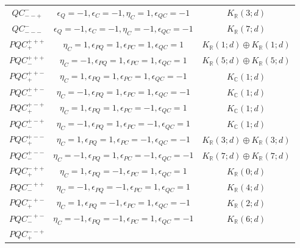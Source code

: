 \documentclass{tADP2e}
\theoremstyle{plain}
\theoremstyle{plain}
\theoremstyle{definition}
\begin{document}
\begin{appendices}
\begin{table}[tbp]
\begin{center}
\begin{tabular}{ccc}
$QC^-_{--+}$ & %
$\epsilon_Q=-1,\epsilon_C=-1,\eta_C=1,\epsilon_{QC}=-1$ & $K_{\mathbb{R}}(3;d)$ \\
$QC^-_{---}$ & %
$\epsilon_Q=-1,\epsilon_C=-1,\eta_C=-1,\epsilon_{QC}=-1$ & $K_{\mathbb{R}}(7;d)$ \\
$PQC^{+++}_+$ & %
$\eta_C=1,\epsilon_{PQ}=1,\epsilon_{PC}=1,\epsilon_{QC}=1$ & $K_{\mathbb{R}}(1;d)\oplus K_{\mathbb{R}}(1;d)$ \\
$PQC^{+++}_-$ & %
$\eta_C=-1,\epsilon_{PQ}=1,\epsilon_{PC}=1,\epsilon_{QC}=1$ & $K_{\mathbb{R}}(5;d)\oplus K_{\mathbb{R}}(5;d)$ \\
$PQC^{++-}_+$ & %
$\eta_C=1,\epsilon_{PQ}=1,\epsilon_{PC}=1,\epsilon_{QC}=-1$ & $K_{\mathbb{C}}(1;d)$ \\
$PQC^{++-}_-$ & %
$\eta_C=-1,\epsilon_{PQ}=1,\epsilon_{PC}=1,\epsilon_{QC}=-1$ & $K_{\mathbb{C}}(1;d)$ \\
$PQC^{+-+}_+$ & %
$\eta_C=1,\epsilon_{PQ}=1,\epsilon_{PC}=-1,\epsilon_{QC}=1$ & $K_{\mathbb{C}}(1;d)$ \\
$PQC^{+-+}_-$ & %
$\eta_C=-1,\epsilon_{PQ}=1,\epsilon_{PC}=-1,\epsilon_{QC}=1$ & $K_{\mathbb{C}}(1;d)$ \\
$PQC^{+--}_+$ & %
$\eta_C=1,\epsilon_{PQ}=1,\epsilon_{PC}=-1,\epsilon_{QC}=-1$ & $K_{\mathbb{R}}(3;d)\oplus K_{\mathbb{R}}(3;d)$ \\
$PQC^{+--}_-$ & %
$\eta_C=-1,\epsilon_{PQ}=1,\epsilon_{PC}=-1,\epsilon_{QC}=-1$ & $K_{\mathbb{R}}(7;d)\oplus K_{\mathbb{R}}(7;d)$ \\
$PQC^{-++}_+$ & %
$\eta_C=1,\epsilon_{PQ}=-1,\epsilon_{PC}=1,\epsilon_{QC}=1$ & $K_{\mathbb{R}}(0;d)$ \\
$PQC^{-++}_-$ & %
$\eta_C=-1,\epsilon_{PQ}=-1,\epsilon_{PC}=1,\epsilon_{QC}=1$ & $K_{\mathbb{R}}(4;d)$ \\
$PQC^{-+-}_+$ & %
$\eta_C=1,\epsilon_{PQ}=-1,\epsilon_{PC}=1,\epsilon_{QC}=-1$ & $K_{\mathbb{R}}(2;d)$ \\
$PQC^{-+-}_-$ & %
$\eta_C=-1,\epsilon_{PQ}=-1,\epsilon_{PC}=1,\epsilon_{QC}=-1$ & $K_{\mathbb{R}}(6;d)$ \\
$PQC^{--+}_+$ & %

\end{tabular}
\end{center}
\end{table}
\end{appendices}
\end{document}
